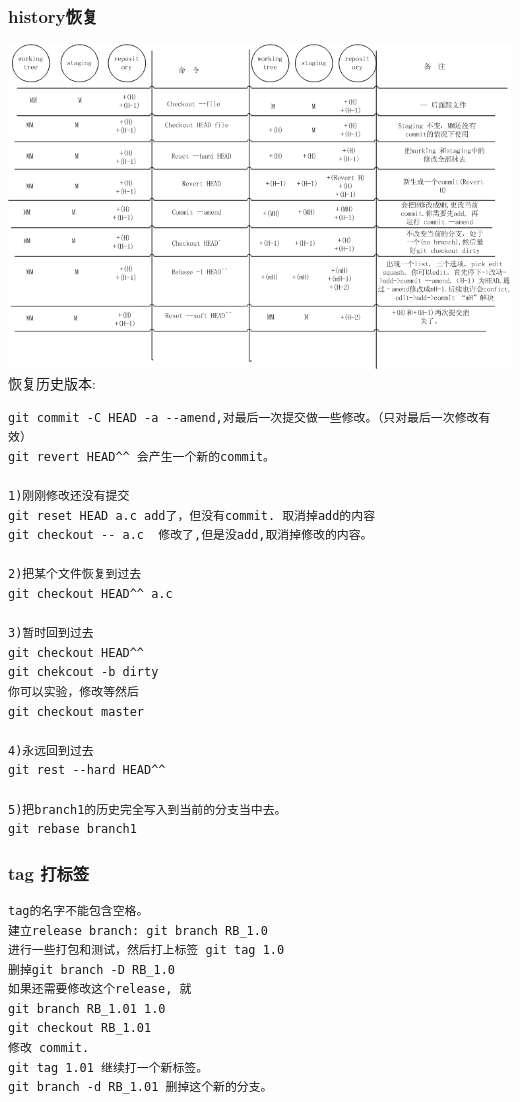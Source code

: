 \documentclass[a4paper,12pt,twoside]{book}
\begin{document}
\begin{CJK*}{UTF8}{song}
\subsubsection{history恢复}
\includegraphics[scale=0.6]{pics/git-history} \\

恢复历史版本: \\
\begin{verbatim}
git commit -C HEAD -a --amend,对最后一次提交做一些修改。（只对最后一次修改有效）
git revert HEAD^^ 会产生一个新的commit。

1)刚刚修改还没有提交
git reset HEAD a.c add了，但没有commit. 取消掉add的内容
git checkout -- a.c  修改了,但是没add,取消掉修改的内容。

2)把某个文件恢复到过去
git checkout HEAD^^ a.c

3)暂时回到过去
git checkout HEAD^^
git chekcout -b dirty
你可以实验，修改等然后
git checkout master

4)永远回到过去
git rest --hard HEAD^^

5)把branch1的历史完全写入到当前的分支当中去。
git rebase branch1
\end{verbatim}



\subsubsection{tag 打标签}
\begin{verbatim}
tag的名字不能包含空格。
建立release branch: git branch RB_1.0
进行一些打包和测试，然后打上标签 git tag 1.0
删掉git branch -D RB_1.0
如果还需要修改这个release, 就
git branch RB_1.01 1.0
git checkout RB_1.01
修改 commit.
git tag 1.01 继续打一个新标签。
git branch -d RB_1.01 删掉这个新的分支。


\end{verbatim}
\end{CJK*}
\end{document}
